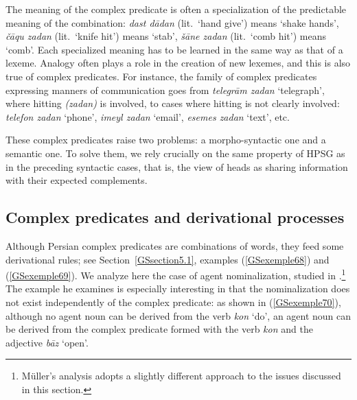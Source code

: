 {The meaning of the complex predicate is often a specialization of the predictable meaning of the combination: \emph{dast d\=adan} (lit.\ `hand give') means `shake hands', \emph{\v c\=aqu zadan} (lit.\ `knife hit') means `stab', \emph{\v s\=ane zadan} (lit.\ `comb hit') means `comb'. Each specialized meaning has to be learned in the same way as that of a lexeme. Analogy often plays a role in the creation of new lexemes, and this is also true of complex predicates. For instance, the family of complex predicates expressing manners of communication goes from \emph{telegr\=am zadan} `telegraph', where hitting \emph{(zadan)} is involved, to cases where hitting is not clearly involved: \emph{telefon zadan} `phone’, \emph{imeyl zadan} `email', \emph{esemes zadan} `text', etc.   

These complex predicates raise two problems: a morpho-syntactic one and a semantic one. To solve them, we rely crucially on the same property of HPSG as in the preceding syntactic cases, that is, the view of heads as sharing information with their expected complements. 

\subsection{Complex predicates and derivational processes}\label{GSsection5.2}

Although Persian complex predicates are combinations of words, they feed some derivational rules; see Section~\ref{GSsection5.1}, examples (\ref{GSexemple68}) and (\ref{GSexemple69}). We analyze here the case of agent nominalization, studied in \cite{MuellerPersian}.\footnote{Müller’s analysis adopts a slightly different approach to the issues discussed in this section.} The example he examines is especially interesting in that the nominalization does not exist independently of the complex predicate: as shown in (\ref{GSexemple70}), although no agent noun can be derived from the verb \emph{kon} `do', an agent noun can be derived from the complex predicate formed with the verb \emph{kon} and the adjective \emph{b\=az} `open'.

\eal 
	\label{GSexemple70} 
    \label{GSexemple70a}
		
}
